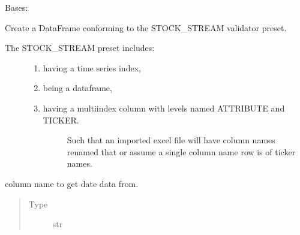 \documentclass[letterpaper,10pt,english]{sphinxmanual}
\begin{document}
\begin{fulllineitems}
\label{\detokenize{dalio.translator:dalio.translator.StockStreamFileTranslator}}
Bases: {\hyperref[\detokenize{dalio.translator:dalio.translator.translator.Translator}]{}}

Create a DataFrame conforming to the STOCK\_STREAM validator preset.
\begin{description}
\item[{The STOCK\_STREAM preset includes:}] \leavevmode\begin{enumerate}
%
\item {} 
having a time series index,

\item {} 
being a dataframe,

\item {} \begin{description}
\item[{having a multiindex column with levels named ATTRIBUTE and TICKER.}] \leavevmode
Such that an imported excel file will have column names renamed
that or assume a single column name row is of ticker names.

\end{description}

\end{enumerate}

\end{description}

\begin{fulllineitems}
\label{\detokenize{dalio.translator:dalio.translator.StockStreamFileTranslator.date_col}}
column name to get date data from.
\begin{quote}\begin{description}
\item[{Type}] \leavevmode
str

\end{description}\end{quote}


\end{fulllineitems}
\end{fulllineitems}
\end{document}
